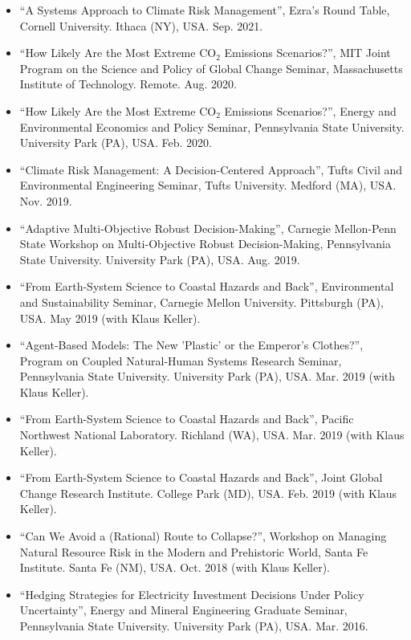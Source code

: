 \documentclass[11pt,article,oneside]{memoir}
\begin{document}
\begin{itemize}[label={}]
\item \enquote{A Systems Approach to Climate Risk Management}, Ezra's Round Table,  Cornell University. Ithaca (NY), USA. Sep. 2021.

\item \enquote{How Likely Are the Most Extreme CO$_2$ Emissions Scenarios?}, MIT Joint Program on the Science and Policy of Global Change Seminar,  Massachusetts Institute of Technology. Remote. Aug. 2020.

\item \enquote{How Likely Are the Most Extreme CO$_2$ Emissions Scenarios?}, Energy and Environmental Economics and Policy Seminar,  Pennsylvania State University. University Park (PA), USA. Feb. 2020.

\item \enquote{Climate Risk Management: A Decision-Centered Approach}, Tufts Civil and Environmental Engineering Seminar,  Tufts University. Medford (MA), USA. Nov. 2019.

\item \enquote{Adaptive Multi-Objective Robust Decision-Making}, Carnegie Mellon-Penn State Workshop on Multi-Objective Robust Decision-Making,  Pennsylvania State University. University Park (PA), USA. Aug. 2019.

\item \enquote{From Earth-System Science to Coastal Hazards and Back}, Environmental and Sustainability Seminar,  Carnegie Mellon University. Pittsburgh (PA), USA. May 2019 (with Klaus Keller).

\item \enquote{Agent-Based Models: The New 'Plastic' or the Emperor's Clothes?}, Program on Coupled Natural-Human Systems Research Seminar,  Pennsylvania State University. University Park (PA), USA. Mar. 2019 (with Klaus Keller).

\item \enquote{From Earth-System Science to Coastal Hazards and Back},  Pacific Northwest National Laboratory. Richland (WA), USA. Mar. 2019 (with Klaus Keller).

\item \enquote{From Earth-System Science to Coastal Hazards and Back},  Joint Global Change Research Institute. College Park (MD), USA. Feb. 2019 (with Klaus Keller).

\item \enquote{Can We Avoid a (Rational) Route to Collapse?}, Workshop on Managing Natural Resource Risk in the Modern and Prehistoric World,  Santa Fe Institute. Santa Fe (NM), USA. Oct. 2018 (with Klaus Keller).

\item \enquote{Hedging Strategies for Electricity Investment Decisions Under Policy Uncertainty}, Energy and Mineral Engineering Graduate Seminar,  Pennsylvania State University. University Park (PA), USA. Mar. 2016.

\end{itemize}
\end{document}
